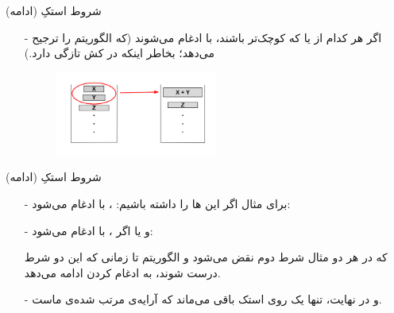 \begin{frame}{شروط استکِ  (ادامه)}
\begin{itemize}\itemr
\item[-]
اگر
هر کدام از  یا  که کوچک‌تر باشند، با  ادغام می‌شوند (که الگوریتم  را ترجیح می‌دهد؛ بخاطر اینکه در کش تازگی دارد.)

\begin{figure}[H]
\begin{center}
\includegraphics[width=0.5\textwidth, height=0.5\textheight]{docs/images/merge}
\end{center}
\end{figure}
\end{itemize}
\end{frame}

\begin{frame}{شروط استکِ  (ادامه)}
\begin{itemize}\itemr
\item[-]
برای مثال اگر این ها را داشته باشیم:
،
با
ادغام می‌شود:
\begin{lfl}
\end{lfl}

\item[-]
و یا اگر
،
با
ادغام می‌شود:
\begin{lfl}
\end{lfl}

که در هر دو مثال شرط دوم نقض می‌شود و الگوریتم تا زمانی که این دو شرط درست شوند، به ادغام کردن ادامه می‌دهد.

\item[-]
و در نهایت، تنها یک 
روی استک باقی می‌ماند که آرایه‌ی مرتب شده‌ی ماست.
\end{itemize}
\end{frame}


